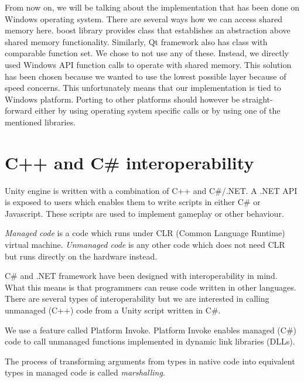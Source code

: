 \documentclass[
  digital, %
  table,   %
  nolof,     %
  nolot,     %
]{fithesis3}
\begin{document}
From now on, we will be talking about the implementation that has been done on Windows operating system. There are several ways how we can access shared memory here. boost library provides class that establishes an abstraction above shared memory functionality. Similarly, Qt framework also has class with comparable function set. We chose to not use any of these. Instead, we directly used Windows API function calls to operate with shared memory. This solution has been chosen because we wanted to use the lowest possible layer because of speed concerns. This unfortunately means that our implementation is tied to Windows platform. Porting to other platforms should however be straight-forward either by using operating system specific calls or by using one of the mentioned libraries.

\section{C++ and C\# interoperability}
Unity engine is written with a combination of C++ and C\#/.NET. A .NET API is exposed to users which enables them to write scripts in either C\# or Javascript. These scripts are used to implement gameplay or other behaviour.

\textit{Managed code} is a code which runs under CLR (Common Language Runtime) virtual machine. \textit{Unmanaged code} is any other code which does not need CLR but runs directly on the hardware instead.

C\# and .NET framework have been designed with interoperability in mind. What this means is that programmers can reuse code written in other languages. There are several types of interoperability but we are interested in calling unmanaged (C++) code from a Unity script written in C\#.

We use a feature called Platform Invoke. Platform Invoke enables managed (C\#) code to call unmanaged functions implemented in dynamic link libraries (DLLs).

The process of transforming arguments from types in native code into equivalent types in managed code is called \textit{marshalling}.


\end{document}
